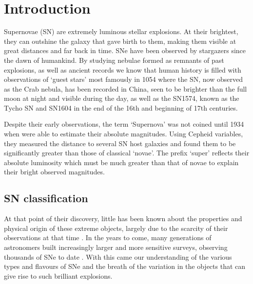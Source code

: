\chapter{Introduction}  \label{Chapter1}

Supernovae (SN) are extremely luminous stellar explosions. At their brightest, they can outshine the galaxy that gave birth to them, making them visible at great distances and far back in time. SNe have been observed by stargazers since the dawn of humankind. By studying nebulae formed as remnants of past explosions, as well as ancient records we know that human history is filled with observations of `guest stars' most famously in 1054 where the SN, now observed as the Crab nebula, has been recorded in China, seen to be brighter than the full moon at night and visible during the day, as well as the SN1574, known as the Tycho SN and SN1604 in the end of the 16th and beginning of 17th centuries.

Despite their early observations, the term `Supernova' was not coined until 1934 when \citet{Baade1934} were able to estimate their absolute magnitudes. Using Cepheid variables, they measured the distance to several SN host galaxies and found them to be significantly greater than those of classical `novae'. The prefix `super' reflects their absolute luminosity which must be much greater than that of novae to explain their bright observed magnitudes.

\section{SN classification}
At that point of their discovery, little has been known about the properties and physical origin of these extreme objects, largely due to the scarcity of their observations at that time \citep{Zwicky1938}. In the years to come, many generations of astronomers built increasingly larger and more sensitive surveys, observing thousands of SNe to date \citep{Alsabti2017}. With this came our understanding of the various types and flavours of SNe and the breath of the variation in the objects that can give rise to such brilliant explosions.

